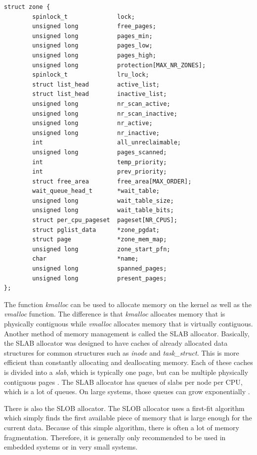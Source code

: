 \documentclass[10pt,draftclsnofoot,onecolumn,journal,compsoc]{IEEEtran}
\begin{document}
\begin{lstlisting}[caption={The \textit{zone} structure in the linux/mmzone.h file.}]
struct zone {
        spinlock_t              lock;
        unsigned long           free_pages;
        unsigned long           pages_min;
        unsigned long           pages_low;
        unsigned long           pages_high;
        unsigned long           protection[MAX_NR_ZONES];
        spinlock_t              lru_lock;
        struct list_head        active_list;
        struct list_head        inactive_list;
        unsigned long           nr_scan_active;
        unsigned long           nr_scan_inactive;
        unsigned long           nr_active;
        unsigned long           nr_inactive;
        int                     all_unreclaimable;
        unsigned long           pages_scanned;
        int                     temp_priority;
        int                     prev_priority;
        struct free_area        free_area[MAX_ORDER];
        wait_queue_head_t       *wait_table;
        unsigned long           wait_table_size;
        unsigned long           wait_table_bits;
        struct per_cpu_pageset  pageset[NR_CPUS];
        struct pglist_data      *zone_pgdat;
        struct page             *zone_mem_map;
        unsigned long           zone_start_pfn;
        char                    *name;
        unsigned long           spanned_pages;
        unsigned long           present_pages;
};
\end{lstlisting}
The function \textit{kmalloc} can be used to allocate memory on the kernel as well as the \textit{vmalloc} function. The difference is that \textit{kmalloc} allocates memory that is physically contiguous while \textit{vmalloc} allocates memory that is virtually contiguous. Another method of memory management is called the SLAB allocator. Basically, the SLAB allocator was designed to have caches of already allocated data structures for common structures such as \textit{inode} and \textit{task\_struct}. This is more efficient than constantly allocating and deallocating memory. Each of these caches is divided into a \textit{slab}, which is typically one page, but can be multiple physically contiguous pages \cite{linux_proc}. The SLAB allocator has queues of slabs per node per CPU, which is a lot of queues. On large systems, those queues can grow exponentially \cite{slub}.  

There is also the SLOB allocator. The SLOB allocator uses a first-fit algorithm which simply finds the first available piece of memory that is large enough for the current data. Because of this simple algorithm, there is often a lot of memory fragmentation. Therefore, it is generally only recommended to be used in embedded systems or in very small systems. 
\end{document}
